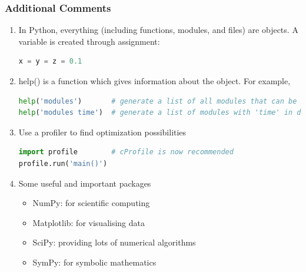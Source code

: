
\begin{frame}[fragile]
	\MyLogo
	\frametitle{Additional Comments}  
	\small
	
\begin{enumerate}

\item In Python, everything (including functions, modules, and files) are objects. A variable is created through assignment:
\begin{lstlisting}[language=python,numbers=none] 
x = y = z = 0.1
\end{lstlisting}
				
\item help() is a function which gives information about the object. For example, 
\begin{lstlisting}[language=python,numbers=none] 
help('modules')       # generate a list of all modules that can be imported
help('modules time')  # generate a list of modules with 'time' in description
\end{lstlisting}
		
\item Use a profiler to find optimization possibilities
\begin{lstlisting}[language=python,numbers=none] 
import profile        # cProfile is now recommended
profile.run('main()')
\end{lstlisting}

\item Some useful and important packages
	\begin{itemize}\setlength\itemsep{0.25em}
	\item NumPy: for scientific computing
	\item Matplotlib: for visualising data
	\item SciPy: providing lots of numerical algorithms
	\item SymPy: for symbolic mathematics
	\end{itemize}
		
\end{enumerate}


\end{frame}


